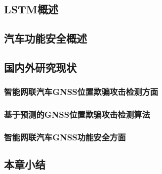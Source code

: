\subsection{LSTM概述}
\subsection{汽车功能安全概述}
\subsection{国内外研究现状}
\subsubsection{智能网联汽车GNSS位置欺骗攻击检测方面}
\subsubsection{基于预测的GNSS位置欺骗攻击检测算法}
\subsubsection{智能网联汽车GNSS功能安全方面}
\subsection{本章小结}
